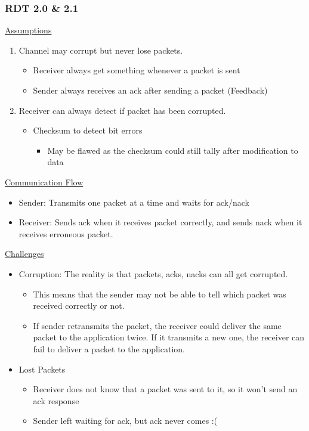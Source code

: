 \documentclass[a4paper]{article}
\begin{document}
\subsubsection{RDT 2.0 \& 2.1}
\underline{Assumptions}
\begin{enumerate}
    \item Channel may corrupt but never lose packets.
    \begin{itemize}[label=$\circ$]
        \item Receiver always get something whenever a packet is sent
        \item Sender always receives an ack after sending a packet (Feedback)
    \end{itemize}
    \item Receiver can always detect if packet has been corrupted.
    \begin{itemize}[label=$\circ$]
        \item Checksum to detect bit errors
        \begin{itemize}[label=\tiny$\blacksquare$]
            \item May be flawed as the checksum could still tally after modification to data
        \end{itemize}
    \end{itemize}
\end{enumerate}

\noindent \underline{Communication Flow}
\begin{itemize}
    \item Sender: Transmits one packet at a time and waits for ack/nack
    \item Receiver: Sends ack when it receives packet correctly, and sends nack when it receives erroneous packet.
\end{itemize}

\newpage
\noindent \underline{Challenges}
\begin{itemize}
    \item Corruption: The reality is that packets, acks, nacks can all get corrupted.
    \begin{itemize}[label=$\circ$]
        \item This means that the sender may not be able to tell which packet was received correctly or not.
        \item If sender retransmits the packet, the receiver could deliver the same packet to the application twice. If it transmits a new one, the receiver can fail to deliver a packet to the application.
    \end{itemize}
    \item Lost Packets
    \begin{itemize}[label=$\circ$]
        \item Receiver does not know that a packet was sent to it, so it won't send an ack response
        \item Sender left waiting for ack, but ack never comes :(
    \end{itemize}
\end{itemize}
\end{document}

